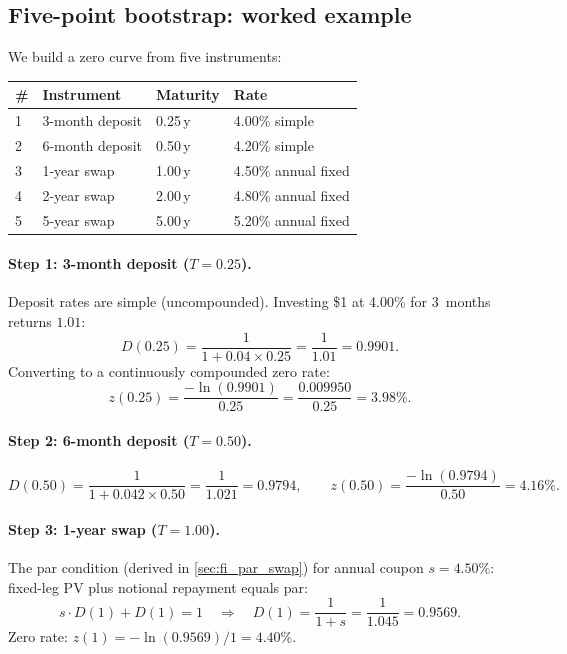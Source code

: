 \subsection{Five-point bootstrap: worked example}
\label{sec:fi_bootstrap_example}

We build a zero curve from five instruments:

\begin{center}
\begin{tabular}{llll}
\toprule
\textbf{\#} & \textbf{Instrument} & \textbf{Maturity} &
  \textbf{Rate} \\
\midrule
1 & 3-month deposit    & 0.25\,y & 4.00\% simple \\
2 & 6-month deposit    & 0.50\,y & 4.20\% simple \\
3 & 1-year swap        & 1.00\,y & 4.50\% annual fixed \\
4 & 2-year swap        & 2.00\,y & 4.80\% annual fixed \\
5 & 5-year swap        & 5.00\,y & 5.20\% annual fixed \\
\bottomrule
\end{tabular}
\end{center}

\paragraph{Step 1: 3-month deposit ($T = 0.25$).}
Deposit rates are simple (uncompounded).  Investing \$1 at 4.00\% for
3~months returns $1.01$:
\begin{equation}
  D(0.25) = \frac{1}{1 + 0.04 \times 0.25} = \frac{1}{1.01}
           = 0.9901.
\end{equation}
Converting to a continuously compounded zero rate:
\begin{equation}
  z(0.25) = \frac{-\ln(0.9901)}{0.25} = \frac{0.009950}{0.25}
           = 3.98\%.
\end{equation}

\paragraph{Step 2: 6-month deposit ($T = 0.50$).}
\begin{equation}
  D(0.50) = \frac{1}{1 + 0.042 \times 0.50} = \frac{1}{1.021}
           = 0.9794,
  \qquad
  z(0.50) = \frac{-\ln(0.9794)}{0.50} = 4.16\%.
\end{equation}

\paragraph{Step 3: 1-year swap ($T = 1.00$).}
The par condition (derived in \cref{sec:fi_par_swap}) for annual
coupon $s = 4.50\%$: fixed-leg PV plus notional repayment equals par:
\begin{equation}
  s \cdot D(1) + D(1) = 1
  \quad\Longrightarrow\quad
  D(1) = \frac{1}{1 + s} = \frac{1}{1.045} = 0.9569.
\end{equation}
Zero rate: $z(1) = -\ln(0.9569)/1 = 4.40\%$.

